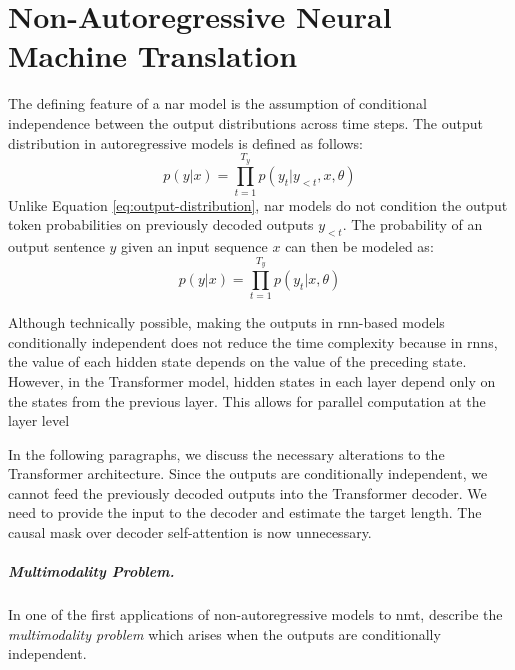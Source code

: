 \chapter{Non-Autoregressive Neural Machine Translation}

The defining feature of a \ac{nar} model is the assumption of
conditional independence between the output distributions across time
steps. The output distribution in autoregressive models is defined as follows:
%
\begin{equation}
  p(y|x) = \prod_{t=1}^{T_y}p(y_t|y_{<t},x,\theta)
  \label{eq:output-distribution}
\end{equation}
%
Unlike Equation \ref{eq:output-distribution}, \Ac{nar} models do not condition
the output token probabilities on previously decoded outputs $y_{<t}$.  The
probability of an output sentence $y$ given an input sequence $x$ can then be
modeled as:
%
\begin{equation}
  p(y|x) = \prod_{t=1}^{T_y}p(y_t|x,\theta)
  \label{eq:nat-output-distribution}
\end{equation}

Although technically possible, making the outputs in \acs{rnn}-based models
conditionally independent does not reduce the time complexity because in
\acsp{rnn}, the value of each hidden state depends on the value of the
preceding state. However, in the Transformer model, hidden states in each layer
depend only on the states from the previous layer. This allows for parallel
computation at the layer level


In the following paragraphs, we discuss the necessary alterations to the
Transformer architecture. Since the outputs are conditionally independent, we
cannot feed the previously decoded outputs into the Transformer decoder. We
need to provide the input to the decoder and estimate the target length. The
causal mask over decoder self-attention is now unnecessary.

\paragraph{Multimodality Problem.} In one of the first applications of
non-autoregressive models to \ac{nmt}, \citet{gu2017nonautoregressive} describe
the \emph{multimodality problem} which arises when the outputs are
conditionally independent.

